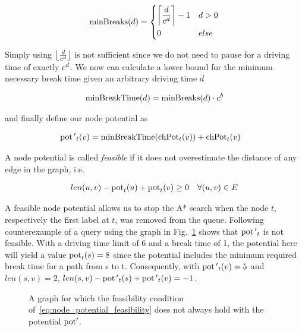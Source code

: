 \begin{align}\label{eq:min_breaks}
	\minBreaks(d) = \begin{dcases}
		\ceil*{ \frac{d}{\restr^d} } - 1 & d > 0 \\
		0                                & else
	\end{dcases}
\end{align}

Simply using $\floor*{ \frac{d}{\restr^d} }$ is not sufficient since we do not need to pause for a driving time of exactly $\restr^d$. We now can calculate a lower bound for the minimum necessary break time given an arbitrary driving time $d$

\begin{align}\label{eq:min_break_time}
	\minBreakTime(d) = \minBreaks(d) \cdot \restr^b
\end{align}

and finally define our node potential as

\begin{align}
	\begin{split}
		\concretepotential{'}_t(v) & = \minBreakTime(\chpotential_t(v)) + \chpotential_t(v)
	\end{split}
\end{align}

A node potential is called \emph{feasible} if it does not overestimate the distance of any edge in the graph, i.e.

\begin{align}
	\label{eq:node_potential_feasibility}
	len(u,v) - \concretepotential_t(u) + \concretepotential_t(v) \ge 0 \quad \forall (u,v) \in E
\end{align}

A feasible node potential allows us to stop the A* search when the node $t$, respectively the first label at $t$, was removed from the queue. Following counterexample of a query using the graph in Fig.~\ref{fig:graph_infeasible_potential} shows that $\concretepotential{'}_t$ is not feasible. With a driving time limit of 6 and a break time of 1, the potential here will yield a value $\concretepotential_t(s) = 8$ since the potential includes the minimum required break time for a path from s to t. Consequently, with $\concretepotential{'}_t(v) = 5$ and $len(s,v) = 2$, $len(s,v) - \concretepotential{'}_t(s) + \concretepotential{'}_t(v) = -1$.

\begin{figure}[hbtp]
	\centering
	
	\caption{A graph for which the feasibility condition of~\ref{eq:node_potential_feasibility} does not always hold with the potential $\concretepotential'$.}
	\label{fig:graph_infeasible_potential}
\end{figure}

